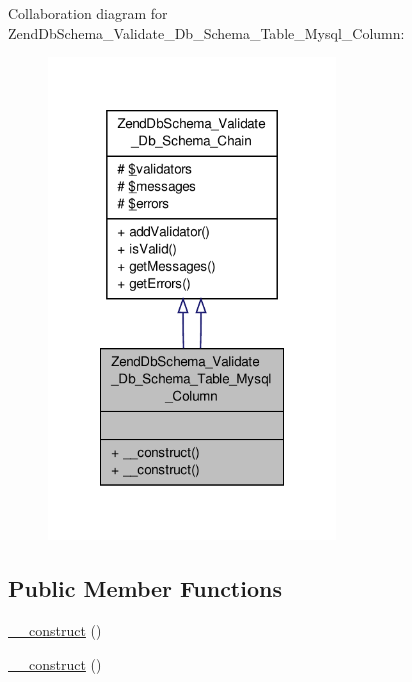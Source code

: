 Collaboration diagram for Zend\-Db\-Schema\-\_\-\-Validate\-\_\-\-Db\-\_\-\-Schema\-\_\-\-Table\-\_\-\-Mysql\-\_\-\-Column\-:\nopagebreak
\begin{figure}[H]
\begin{center}
\leavevmode
\includegraphics[width=216pt]{classZendDbSchema__Validate__Db__Schema__Table__Mysql__Column__coll__graph}
\end{center}
\end{figure}
\subsection*{Public Member Functions}
\begin{DoxyCompactItemize}
\item 
\hyperlink{classZendDbSchema__Validate__Db__Schema__Table__Mysql__Column_ae38df04ac7dbefb5fb85a05f3ae6f791}{\-\_\-\-\_\-construct} ()
\item 
\hyperlink{classZendDbSchema__Validate__Db__Schema__Table__Mysql__Column_ae38df04ac7dbefb5fb85a05f3ae6f791}{\-\_\-\-\_\-construct} ()
\end{DoxyCompactItemize}

